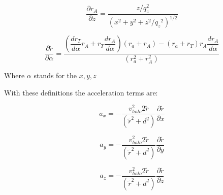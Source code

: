 \begin{equation}
\dfrac{\partial r_A}{\partial z} = \dfrac{z/q_z^2}{(x^2 + y^2 + z^2/{q_z}^2)^{1/2}}
\end{equation}

\begin{equation}
\dfrac{\partial \tilde{r}}{\partial \alpha} = \dfrac{\left( \dfrac{dr_T}{d\alpha} r_A + r_T \dfrac{dr_A}{d\alpha}\right) (r_a + r_A) - (r_a + r_T)r_A \dfrac{dr_A}{d\alpha} }{(r_a^2 + r_A^2)}
\end{equation}

Where $\alpha$ stands for the $x, y, z$

With these definitions the acceleration terms are:

\begin{equation}
a_x = - \dfrac{v_{halo}^2 2 \tilde{r}}{(\tilde{r}^2 + d^2)} \dfrac{\partial \tilde{r}}{\partial x}
\end{equation}

\begin{equation}
a_y = - \dfrac{v_{halo}^2 2 \tilde{r}}{(\tilde{r}^2 + d^2)} \dfrac{\partial \tilde{r}}{\partial y}
\end{equation}

\begin{equation}
a_z = - \dfrac{v_{halo}^2 2 \tilde{r}}{(\tilde{r}^2 + d^2)} \dfrac{\partial \tilde{r}}{\partial z}
\end{equation}


